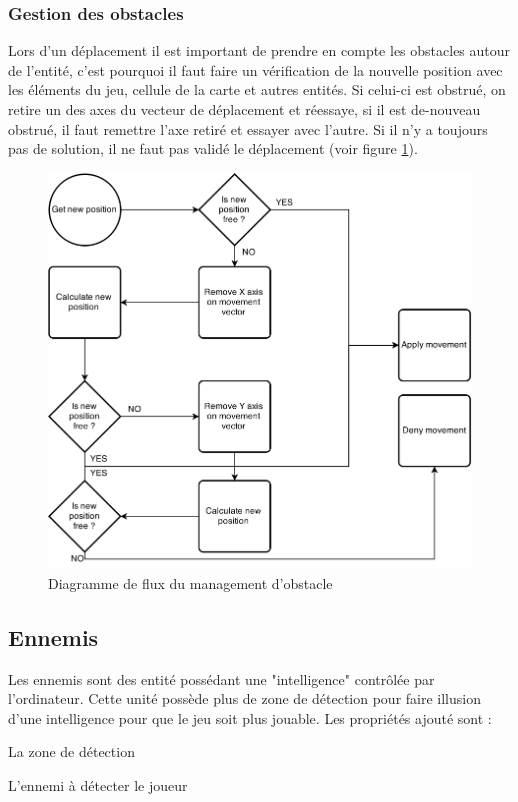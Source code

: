 \documentclass[11pt, a4paper, oneside]{report}
\begin{document}
\subsubsection{Gestion des obstacles}
Lors d'un déplacement il est important de prendre en compte les obstacles autour de l'entité, c'est pourquoi il faut faire un vérification de la nouvelle position avec les éléments du jeu, cellule de la carte et autres entités. Si celui-ci est obstrué, on retire un des axes du vecteur de déplacement et réessaye, si il est de-nouveau obstrué, il faut remettre l'axe retiré et essayer avec l'autre. Si il n'y a toujours pas de solution, il ne faut pas validé le déplacement (voir figure \ref{fig:ObstacleManagement}).
\begin{figure}[htp]
	\begin{center}
	\includegraphics[width=.75\textwidth]{ObstacleManagement}
	\caption{Diagramme de flux du management d'obstacle}
	\label{fig:ObstacleManagement}
	\end{center}
\end{figure}

\subsection{Ennemis}
Les ennemis sont des entité possédant une "intelligence" contrôlée par l'ordinateur. Cette unité possède plus de zone de détection pour faire illusion d'une intelligence pour que le jeu soit plus jouable. Les propriétés ajouté sont :
\begin{description}[labelindent=0.5cm]
	\item[FieldOfView] La zone de détection
	\item[IsAlerted] L'ennemi à détecter le joueur
\end{description}
\end{document}
